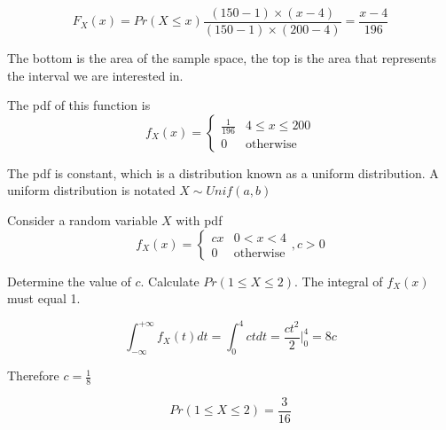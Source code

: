 \documentclass{report}
\begin{document}
\begin{description}
\begin{mdframed}
            \begin{displaymath}
                F_X(x) = Pr(X \le x)
                \frac{(150 -1) \times (x - 4)}{(150 -1) \times (200-4)}
                = \frac{x-4}{196}
            \end{displaymath}

            The bottom is the area of the sample space,
            the top is the area that represents the
            interval we are interested in.
            
            The pdf of this function is
            \begin{displaymath}
                f_X(x) =  
                \begin{cases}
                    \frac{1}{196} & 4 \le x \le 200\\ 
                    0 & \textrm{otherwise}
                \end{cases}
            \end{displaymath}

            The pdf is constant, which is a distribution known
            as a uniform distribution. A uniform distribution
            is notated $X \sim Unif(a,b)$
        \end{mdframed}
        \begin{mdframed}
            Consider a random variable $X$ with pdf
             \begin{displaymath}
                f_X(x) = 
                \begin{cases}
                    cx & 0 < x < 4\\ 
                    0 & \textrm{otherwise}
                \end{cases}
                ,c > 0
            \end{displaymath}

            Determine the value of $c$. Calculate  $Pr(1 \le X \le 2)$.
            The integral of  $f_X(x)$ must equal 1.

             \begin{displaymath}
                \int_{-\infty}^{+\infty}f_X(t)dt =
                \int_{0}^{4}ct dt =
                \frac{ct^2}{2}\bigg\rvert_{0}^{4} =
                8c
            \end{displaymath}

            Therefore $c = \frac{1}{8}$
            
            \begin{displaymath}
                Pr(1 \le X \le 2) = \frac{3}{16}
            \end{displaymath}
        \end{mdframed}
    \item {\Large }
\end{description}
\end{document}
